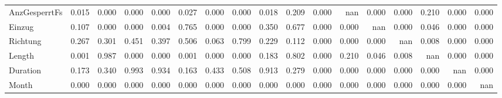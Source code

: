 \begin{tabular}{lrrrrrrrrrrrrrrrr}
AnzGesperrtFs &    0.015 &    0.000 &    0.000 &    0.000 &     0.027 &     0.000 &     0.000 &  0.018 &  0.209 &    0.000 &            nan &   0.000 &     0.000 &   0.210 &     0.000 &  0.000 \\
Einzug        &    0.107 &    0.000 &    0.000 &    0.004 &     0.765 &     0.000 &     0.000 &  0.350 &  0.677 &    0.000 &          0.000 &     nan &     0.000 &   0.046 &     0.000 &  0.000 \\
Richtung      &    0.267 &    0.301 &    0.451 &    0.397 &     0.506 &     0.063 &     0.799 &  0.229 &  0.112 &    0.000 &          0.000 &   0.000 &       nan &   0.008 &     0.000 &  0.000 \\
Length        &    0.001 &    0.987 &    0.000 &    0.000 &     0.001 &     0.000 &     0.000 &  0.183 &  0.802 &    0.000 &          0.210 &   0.046 &     0.008 &     nan &     0.000 &  0.000 \\
Duration      &    0.173 &    0.340 &    0.993 &    0.934 &     0.163 &     0.433 &     0.508 &  0.913 &  0.279 &    0.000 &          0.000 &   0.000 &     0.000 &   0.000 &       nan &  0.000 \\
Month         &    0.000 &    0.000 &    0.000 &    0.000 &     0.000 &     0.000 &     0.000 &  0.000 &  0.000 &    0.000 &          0.000 &   0.000 &     0.000 &   0.000 &     0.000 &    nan \\
\bottomrule
\end{tabular}
